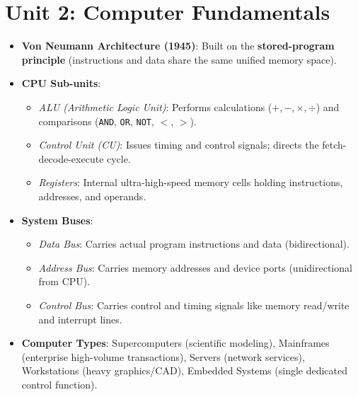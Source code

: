 \section*{Unit 2: Computer Fundamentals}
\begin{itemize}[leftmargin=6mm]
    \item \textbf{Von Neumann Architecture (1945)}: Built on the \textbf{stored-program principle} (instructions and data share the same unified memory space).
    \item \textbf{CPU Sub-units}:
    \begin{itemize}
        \item \textit{ALU (Arithmetic Logic Unit)}: Performs calculations ($+, -, \times, \div$) and comparisons (\texttt{AND}, \texttt{OR}, \texttt{NOT}, $<$, $>$).
        \item \textit{Control Unit (CU)}: Issues timing and control signals; directs the fetch-decode-execute cycle.
        \item \textit{Registers}: Internal ultra-high-speed memory cells holding instructions, addresses, and operands.
    \end{itemize}
    \item \textbf{System Buses}:
    \begin{itemize}
        \item \textit{Data Bus}: Carries actual program instructions and data (bidirectional).
        \item \textit{Address Bus}: Carries memory addresses and device ports (unidirectional from CPU).
        \item \textit{Control Bus}: Carries control and timing signals like memory read/write and interrupt lines.
    \end{itemize}
    \item \textbf{Computer Types}: Supercomputers (scientific modeling), Mainframes (enterprise high-volume transactions), Servers (network services), Workstations (heavy graphics/CAD), Embedded Systems (single dedicated control function).
\end{itemize}

